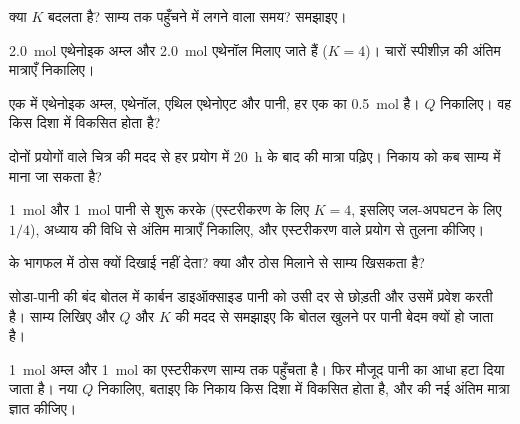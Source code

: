 \begin{exercise}[$\star$]\label{exo:g12:equilibrium:5}
क्या  $K$ बदलता है? साम्य तक पहुँचने में लगने वाला समय? समझाइए।
\end{exercise}

\begin{exercise}[$\star\star$]\label{exo:g12:equilibrium:6}
\qty{2.0}{mol} एथेनोइक अम्ल और \qty{2.0}{mol} एथेनॉल मिलाए जाते हैं
($K = 4$)। चारों स्पीशीज़ की अंतिम मात्राएँ निकालिए।
\end{exercise}

\begin{exercise}[$\star\star$]\label{exo:g12:equilibrium:7}
एक  में एथेनोइक अम्ल, एथेनॉल, एथिल
एथेनोएट और पानी, हर एक का \qty{0.5}{mol} है। $Q$ निकालिए। वह किस दिशा में विकसित होता है?
\end{exercise}

\begin{exercise}[$\star\star$]\label{exo:g12:equilibrium:8}
दोनों प्रयोगों वाले चित्र की मदद से हर प्रयोग में \qty{20}{h} के बाद
 की मात्रा पढ़िए। निकाय को कब
साम्य में माना जा सकता है?
\end{exercise}

\begin{exercise}[$\star\star$]\label{exo:g12:equilibrium:9}
\qty{1}{mol}  और \qty{1}{mol} पानी से शुरू करके (एस्टरीकरण के लिए $K = 4$,
इसलिए जल-अपघटन के लिए $1/4$), अध्याय की विधि से अंतिम
मात्राएँ निकालिए, और एस्टरीकरण वाले प्रयोग से
तुलना कीजिए।
\end{exercise}

\begin{exercise}[$\star\star$]\label{exo:g12:equilibrium:10}
 के भागफल में ठोस क्यों दिखाई नहीं देता?
क्या और ठोस मिलाने से
साम्य खिसकता है?
\end{exercise}

\begin{exercise}[$\star\star$]\label{exo:g12:equilibrium:11}
सोडा-पानी की बंद बोतल में कार्बन डाइऑक्साइड पानी को उसी दर से छोड़ती और उसमें प्रवेश करती है।
साम्य  लिखिए और $Q$ और $K$ की मदद से
समझाइए कि बोतल खुलने पर पानी बेदम क्यों हो जाता है।
\end{exercise}

\begin{exercise}[$\star\star\star$]\label{exo:g12:equilibrium:12}
\qty{1}{mol} अम्ल और \qty{1}{mol}  का एस्टरीकरण
साम्य तक पहुँचता है। फिर मौजूद पानी का आधा हटा दिया जाता है। नया $Q$
निकालिए, बताइए कि निकाय किस दिशा में विकसित होता है, और  की नई
अंतिम मात्रा ज्ञात कीजिए।
\end{exercise}

